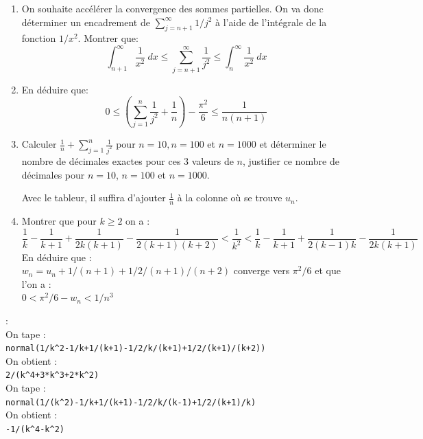 \documentclass[a4paper,11pt]{book}
\begin{document}
\begin{enumerate}
\item On souhaite acc\'el\'erer la convergence des sommes partielles.
On va donc d\'eterminer un encadrement de $\sum _{j=n+1}^\infty 1/j^2$
\`a l'aide de l'int\'egrale de la fonction $1/x^2$.
Montrer que:
\[ \int _{n+1}^\infty \frac{1}{x^2} \ dx  \leq \sum _{j=n+1}^\infty 
\frac{1}{j^2} \leq \int _{n}^\infty \frac{1}{x^2}\ dx \]

\item En d\'eduire que:
\[ 0 \leq \left(\sum _{j=1} ^n \frac{1}{j^2} +
\frac{1}{n}\right) -\frac{\pi^2}{6}
\leq \frac{1}{n(n+1)}  \]


\item Calculer $\frac{1}{n}+ \sum _{j=1} ^n \frac{1}{j^2}$ pour $n=10, n=100$
et $n=1000$ et d\'eterminer le nombre de d\'ecimales exactes pour ces
3 valeurs de $n$, justifier ce nombre de d\'ecimales pour $n=10$,
$n=100$ et $ n=1000$.

Avec le tableur, il suffira d'ajouter $\frac{1}{n} $ \`a la colonne o\`u se 
trouve $u_n$.\\
\item 
Montrer que pour $k\geq 2$ on a :\\
$$\frac{1}{k}-\frac{1}{k+1}+\frac{1}{2k(k+1)}-\frac{1}{2(k+1)(k+2)}<\frac{1}{k^2}<\frac{1}{k}-\frac{1}{k+1}+\frac{1}{2(k-1)k}-\frac{1}{2k(k+1)}$$
En d\'eduire que :\\
$w_n=u_n+1/(n+1)+1/2/(n+1)/(n+2)$ converge vers $\pi^2/6$ et que l'on a :\\
$0<\pi^2/6-w_n<1/n^3$
\end{enumerate}

 :\\
On tape :\\
{\tt normal(1/k\verb|^|2-1/k+1/(k+1)-1/2/k/(k+1)+1/2/(k+1)/(k+2))}\\
On obtient :\\
{\tt 2/(k\verb|^|4+3*k\verb|^|3+2*k\verb|^|2)}\\
On tape :\\
{\tt normal(1/(k\verb|^|2)-1/k+1/(k+1)-1/2/k/(k-1)+1/2/(k+1)/k)}\\
On obtient :\\
{\tt -1/(k\verb|^|4-k\verb|^|2)}\\
\end{document}

